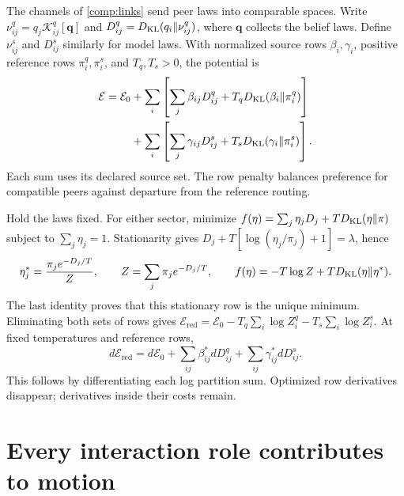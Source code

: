 The channels of \cref{comp:links} send peer laws into comparable spaces. Write $\nu^q_{ij}=q_j\mathcal K^q_{ij}[\mathbf q]$ and $D^q_{ij}=D_{\mathrm{KL}}(q_i\Vert\nu^q_{ij})$, where $\mathbf q$ collects the belief laws. Define $\nu^s_{ij}$ and $D^s_{ij}$ similarly for model laws. With normalized source rows $\beta_i,\gamma_i$, positive reference rows $\pi_i^q,\pi_i^s$, and $T_q,T_s>0$, the potential is
\begin{equation}
 \begin{aligned}
 \mathcal E=\mathcal E_0
 &+\sum_i\left[\sum_j\beta_{ij}D^q_{ij}
                  +T_qD_{\mathrm{KL}}(\beta_i\Vert\pi_i^q)\right]\\
 &+\sum_i\left[\sum_j\gamma_{ij}D^s_{ij}
                  +T_sD_{\mathrm{KL}}(\gamma_i\Vert\pi_i^s)\right].
 \end{aligned}
 \label{eq:comp-potential}
\end{equation}
Each sum uses its declared source set. The row penalty balances preference for compatible peers against departure from the reference routing.

Hold the laws fixed. For either sector, minimize $f(\eta)=\sum_j\eta_jD_j+TD_{\mathrm{KL}}(\eta\Vert\pi)$ subject to $\sum_j\eta_j=1$. Stationarity gives $D_j+T[\log(\eta_j/\pi_j)+1]=\lambda$, hence
\begin{equation}
 \eta_j^*=\frac{\pi_je^{-D_j/T}}{Z},\qquad
 Z=\sum_j\pi_je^{-D_j/T},\qquad
 f(\eta)=-T\log Z+TD_{\mathrm{KL}}(\eta\Vert\eta^*).
 \label{eq:comp-source-row}
\end{equation}
The last identity proves that this stationary row is the unique minimum. Eliminating both sets of rows gives $\mathcal E_{\mathrm{red}}=\mathcal E_0-T_q\sum_i\log Z_i^q-T_s\sum_i\log Z_i^s$. At fixed temperatures and reference rows,
\begin{equation}
 d\mathcal E_{\mathrm{red}}
 =d\mathcal E_0+\sum_{ij}\beta_{ij}^*dD^q_{ij}
                   +\sum_{ij}\gamma_{ij}^*dD^s_{ij}.
 \label{eq:comp-envelope}
\end{equation}
This follows by differentiating each log partition sum. Optimized row derivatives disappear; derivatives inside their costs remain.

\section{Every interaction role contributes to motion}

